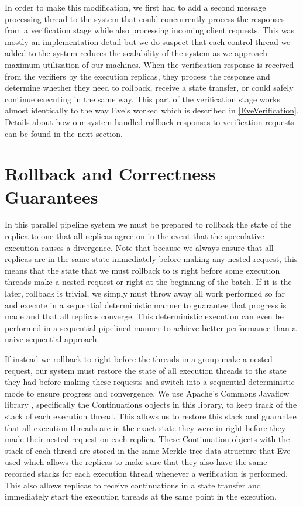 \documentclass[11pt, oneside]{report}
\begin{document}
In order to make this modification, we first had to add a second message processing thread to the system that could concurrently process the responses from a verification stage while also processing incoming client requests. 
This was mostly an implementation detail but we do suspect that each control thread we added to the system reduces the scalability of the system as we approach maximum utilization of our machines.
When the verification response is received from the verifiers by the execution replicas, they process the response and determine whether they need to rollback, receive a state transfer, or could safely continue executing in the same way. 
This part of the verification stage works almost identically to the way Eve's worked which is described in \ref{EveVerification}.
Details about how our system handled rollback responses to verification requests can be found in the next section.

\section{Rollback and Correctness Guarantees}

In this parallel pipeline system we must be prepared to rollback the state of the replica to one that all replicas agree on in the event that the speculative execution causes a divergence. 
Note that because we always ensure that all replicas are in the same state immediately before making any nested request, this means that the state that we must rollback to is right before some execution threads make a nested request or right at the beginning of the batch. 
If it is the later, rollback is trivial, we simply must throw away all work performed so far and execute in a sequential deterministic manner to guarantee that progress is made and that all replicas converge. 
This deterministic execution can even be performed in a sequential pipelined manner to achieve better performance than a naive sequential approach.

If instead we rollback to right before the threads in a group make a nested request, our system must restore the state of all execution threads to the state they had before making these requests and switch into a sequential deterministic mode to ensure progress and convergence. 
We use Apache's Commons Javaflow library \cite{javaflow}, specifically the Continuations objects in this library, to keep track of the stack of each execution thread.
This allows us to restore this stack and guarantee that all execution threads are in the exact state they were in right before they made their nested request on each replica. 
These Continuation objects with the stack of each thread are stored in the same Merkle tree data structure that Eve used which allows the replicas to make sure that they also have the same recorded stacks for each execution thread whenever a verification is performed. 
This also allows replicas to receive continuations in a state transfer and immediately start the execution threads at the same point in the execution. 
\end{document}
